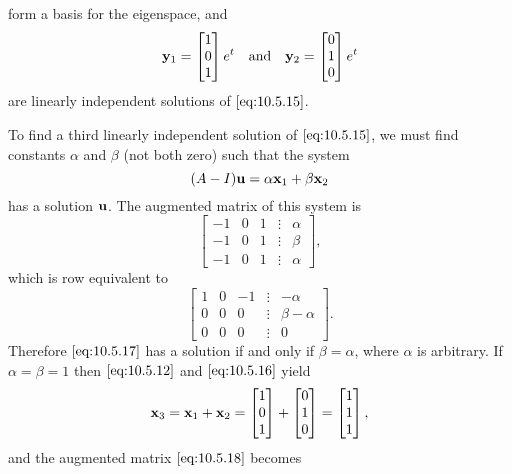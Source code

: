 \documentclass{ximera}
\begin{document}
\begin{example}
\begin{explanation}
\begin{equation}
\end{equation}
form a basis for the eigenspace, and
$$
{\bf y}_1  =\begin{bmatrix}1\\0\\1\end{bmatrix}e^t\quad\mbox{and}\quad {\bf y}_2=\begin{bmatrix}0\\1\\0\end{bmatrix}e^t
$$
are linearly independent solutions of   $\eqref{eq:10.5.15}$.

To find a third linearly independent solution of  $\eqref{eq:10.5.15}$, we
must
find constants $\alpha$  and $\beta$ (not both zero) such that the system
\begin{equation}\label{eq:10.5.17}
(A-I){\bf u}=\alpha{\bf x}_1+\beta{\bf x}_2
\end{equation}
has a solution ${\bf u}$. The augmented matrix of this system is
$$
\begin{bmatrix} -1 & 0 & 1 &\vdots &\alpha\\
-1& 0 & 1 &\vdots &\beta\\ -1 & 0 & 1 &
\vdots &\alpha\end{bmatrix}, $$
which is row equivalent to
\begin{equation}\label{eq:10.5.18}
\begin{bmatrix} 1 & 0 &- 1 &\vdots& -\alpha\\ 0 & 0 & 0
&\vdots&\beta-\alpha\\ 0 & 0 & 0 &\vdots&0\end{bmatrix}.
\end{equation}
Therefore  $\eqref{eq:10.5.17}$ has a solution if and only if
$\beta=\alpha$, where $\alpha$ is arbitrary. If
$\alpha=\beta=1$ then $\eqref{eq:10.5.12}$ and $\eqref{eq:10.5.16}$ yield
$$
{\bf x}_3={\bf x}_1+{\bf x}_2=
\begin{bmatrix}1\\0\\1\end{bmatrix}+\begin{bmatrix}0\\1\\0\end{bmatrix}=\begin{bmatrix}1\\1\\1\end{bmatrix},
$$
and the augmented matrix $\eqref{eq:10.5.18}$  becomes

\end{explanation}
\end{example}
\end{document}
